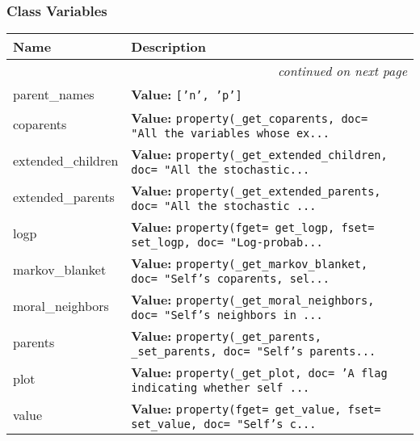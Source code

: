 
  \subsubsection{Class Variables}

\begin{longtable}{|p{}|p{}|l}
\cline{1-2}
\cline{1-2} \centering \textbf{Name} & \centering \textbf{Description}& \\
\cline{1-2}
\endhead\cline{1-2}\multicolumn{3}{r}{\small\textit{continued on next page}}\\\endfoot\cline{1-2}
\endlastfoot\raggedright p\-a\-r\-e\-n\-t\-\_\-n\-a\-m\-e\-s\- & \raggedright \textbf{Value:} 
{\tt ['n', 'p']}&\\
\cline{1-2}
\raggedright c\-o\-p\-a\-r\-e\-n\-t\-s\- & \raggedright \textbf{Value:} 
{\tt property(\_get\_coparents, doc= "All the variables whose ex\texttt{...}}&\\
\cline{1-2}
\raggedright e\-x\-t\-e\-n\-d\-e\-d\-\_\-c\-h\-i\-l\-d\-r\-e\-n\- & \raggedright \textbf{Value:} 
{\tt property(\_get\_extended\_children, doc= "All the stochastic\texttt{...}}&\\
\cline{1-2}
\raggedright e\-x\-t\-e\-n\-d\-e\-d\-\_\-p\-a\-r\-e\-n\-t\-s\- & \raggedright \textbf{Value:} 
{\tt property(\_get\_extended\_parents, doc= "All the stochastic \texttt{...}}&\\
\cline{1-2}
\raggedright l\-o\-g\-p\- & \raggedright \textbf{Value:} 
{\tt property(fget= get\_logp, fset= set\_logp, doc= "Log-probab\texttt{...}}&\\
\cline{1-2}
\raggedright m\-a\-r\-k\-o\-v\-\_\-b\-l\-a\-n\-k\-e\-t\- & \raggedright \textbf{Value:} 
{\tt property(\_get\_markov\_blanket, doc= "Self's coparents, sel\texttt{...}}&\\
\cline{1-2}
\raggedright m\-o\-r\-a\-l\-\_\-n\-e\-i\-g\-h\-b\-o\-r\-s\- & \raggedright \textbf{Value:} 
{\tt property(\_get\_moral\_neighbors, doc= "Self's neighbors in \texttt{...}}&\\
\cline{1-2}
\raggedright p\-a\-r\-e\-n\-t\-s\- & \raggedright \textbf{Value:} 
{\tt property(\_get\_parents, \_set\_parents, doc= "Self's parents\texttt{...}}&\\
\cline{1-2}
\raggedright p\-l\-o\-t\- & \raggedright \textbf{Value:} 
{\tt property(\_get\_plot, doc= 'A flag indicating whether self \texttt{...}}&\\
\cline{1-2}
\raggedright v\-a\-l\-u\-e\- & \raggedright \textbf{Value:} 
{\tt property(fget= get\_value, fset= set\_value, doc= "Self's c\texttt{...}}&\\
\cline{1-2}
\end{longtable}

